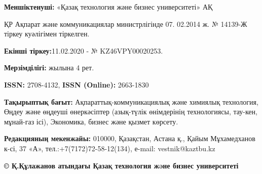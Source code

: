 {\textbf{Меншіктенуші:} «Қазақ технология және бизнес университеті» АҚ

ҚР Ақпарат және коммуникациялар министрлігінде 07. 02.2014 ж. № 14139-Ж
тіркеу куәлігімен тіркелген.

\textbf{Екінші тіркеу:}11.02.2020 - № KZ46VPY00020253.

\textbf{Мерзімділігі:} жылына 4 рет.

\textbf{ISSN:} 2708-4132, \textbf{ISSN (Online):} 2663-1830

\textbf{Тақырыптық бағыт:} Ақпараттық-коммуникациялық және химиялық
технология, Өңдеу және өңдеуші өнеркәсіптер (азық-түлік өнімдерінің
технологиясы, тау-кен, мұнай-газ ісі), Экономика, бизнес және қызмет көрсету.

\textbf{Редакцияның мекенжайы:} 010000, Қазақстан, Астана қ., Қайым
Мұхамедханов к-сі, 37 «А», тел.:+7(7172)72-58-12(134), е-mail:
vestnik@kaztbu.kz
\vfill
\begin{center}
\textbf{\normalsize © Қ.Құлажанов атындағы Қазақ технология жəне бизнес университеті}
\end{center}
}

